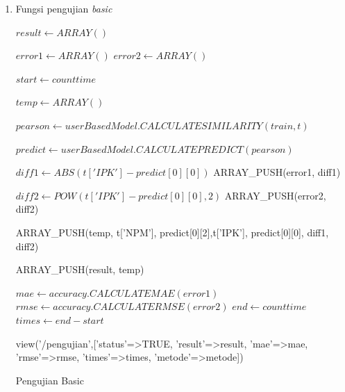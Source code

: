\begin{enumerate}
    \item Fungsi pengujian \textit{basic}\\
    
        \begin{algorithm}[H]
            \begin{algorithmic}[1]
                   \State $result \gets ARRAY()$
                   
                   \State $error1 \gets ARRAY()$
                   \State $error2 \gets ARRAY()$
                   
                        \State $start \gets count time$
                        
                            \State $temp \gets ARRAY()$
                            
                            \State $pearson \gets userBasedModel.CALCULATESIMILARITY(train, t)$
                            
                            \State $predict \gets userBasedModel.CALCULATEPREDICT(pearson)$
                            
                                \State $diff1 \gets ABS(t['IPK'] - predict[0][0])$
                                \State ARRAY\_PUSH(error1, diff1)
                                
                                \State $diff2 \gets POW(t['IPK'] - predict[0][0],2)$
                                \State ARRAY\_PUSH(error2, diff2)
                                
                                \State ARRAY\_PUSH(temp, t['NPM'], predict[0][2],t['IPK'], predict[0][0], diff1, diff2)
                                
                                \State ARRAY\_PUSH(result, temp)
                            \EndIf
                        \EndIf
                   \EndFor
                   
                   \State $mae \gets accuracy.CALCULATEMAE(error1)$
                   \State $rmse \gets accuracy.CALCULATERMSE(error2)$
                   \State $end \gets count time$
                   \State $times \gets end - start$
                   
                   \State \Return view('/pengujian',['status'=>TRUE, 'result'=>result, 'mae'=>mae, 'rmse'=>rmse, 'times'=>times, 'metode'=>metode])
                \EndProcedure
            \end{algorithmic} 
            \caption{Pengujian Basic}
            \label{alg:pengujianBasic}
        \end{algorithm}
    

\end{enumerate}

